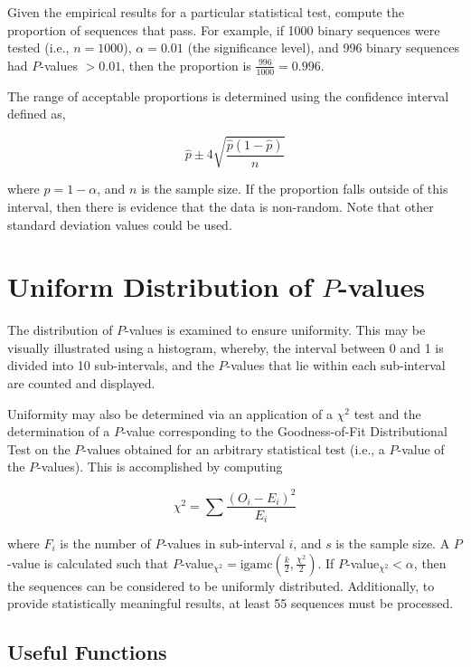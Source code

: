\documentclass[12pt,openany]{book}
\theoremstyle{definition}
\begin{document}
	Given the empirical results for a particular statistical test, compute the proportion of sequences that pass. For example, if 1000 binary sequences were tested (i.e., \( n = 1000 \)), \( \alpha = 0.01 \) (the significance level), and 996 binary sequences had \( P \)-values \( > 0.01 \), then the proportion is \( \frac{996}{1000} = 0.996 \).
	
	The range of acceptable proportions is determined using the confidence interval defined as,
	
	\[ \hat{p} \pm 4 \sqrt{\frac{\hat{p}(1 - \hat{p})}{n}} \]
	
	where \( \hat{p} = 1 - \alpha \), and \( n \) is the sample size. If the proportion falls outside of this interval, then there is evidence that the data is non-random. Note that other standard deviation values could be used. 
	
	\section{Uniform Distribution of \( P \)-values}
	
	The distribution of \( P \)-values is examined to ensure uniformity. This may be visually illustrated using a histogram, whereby, the interval between 0 and 1 is divided into 10 sub-intervals, and the \( P \)-values that lie within each sub-interval are counted and displayed.
	
	Uniformity may also be determined via an application of a \( \chi^2 \) test and the determination of a \( P \)-value corresponding to the Goodness-of-Fit Distributional Test on the \( P \)-values obtained for an arbitrary statistical test (i.e., a \( P \)-value of the \( P \)-values). This is accomplished by computing
	
	\[ \chi^2 = \sum \frac{(O_i - E_i)^2}{E_i} \]
	
	where \( F_i \) is the number of \( P \)-values in sub-interval \( i \), and \( s \) is the sample size. A \( P \)-value is calculated such that \( P \)-value\( _{\chi^2} = \text{igamc}(\frac{k}{2}, \frac{\chi^2}{2}) \). If \( P \)-value\( _{\chi^2} < \alpha \), then the sequences can be considered to be uniformly distributed. Additionally, to provide statistically meaningful results, at least 55 sequences must be processed.
	
	\newpage
	\subsection{Useful Functions}
	
\end{document}
